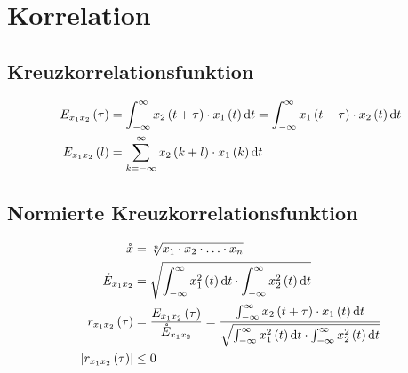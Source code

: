 \section{Korrelation}
\subsection*{Kreuzkorrelationsfunktion}
\begin{align*}
E_{x_1x_2}\left(\tau\right) &=\int_{-\infty}^\infty x_2\left(t+\tau\right)\cdot
x_1\left(t\right)\mathop{}\!\mathrm{d} t=\int_{-\infty}^\infty x_1\left(t-\tau\right)\cdot x_2\left(t\right)\mathop{}\!\mathrm{d} t\\
E_{x_1x_2}\left(l\right) &=\sum_{k=-\infty}^\infty x_2\left(k+l\right)\cdot x_1\left(k\right)\mathop{}\!\mathrm{d} t
\end{align*}

\subsection*{Normierte Kreuzkorrelationsfunktion}
\begin{align*}
\mathring{x} &=\sqrt[n]{x_1\cdot x_2\cdot \dotsc \cdot x_n}\\
\mathring{E}_{x_1x_2} &=\sqrt{\int_{-\infty}^\infty x_1^2\left(t\right)\mathop{}\!\mathrm{d} t\cdot
\int_{-\infty}^\infty x_2^2\left(t\right)\mathop{}\!\mathrm{d} t}\\
r_{x_1x_2}\left(\tau\right)
&=\frac{E_{x_1x_2}\left(\tau\right)}{\mathring{E}_{x_1x_2}}=\frac{\int_{-\infty}^\infty x_2\left(t+\tau\right)\cdot x_1\left(t\right)\mathop{}\!\mathrm{d} t}{\sqrt{\int_{-\infty}^\infty x_1^2\left(t\right)\mathop{}\!\mathrm{d} t\cdot \int_{-\infty}^\infty x_2^2\left(t\right)\mathop{}\!\mathrm{d} t}}\\
\left|r_{x_1x_2}\left(\tau\right)\right| &\leq 0
\end{align*}